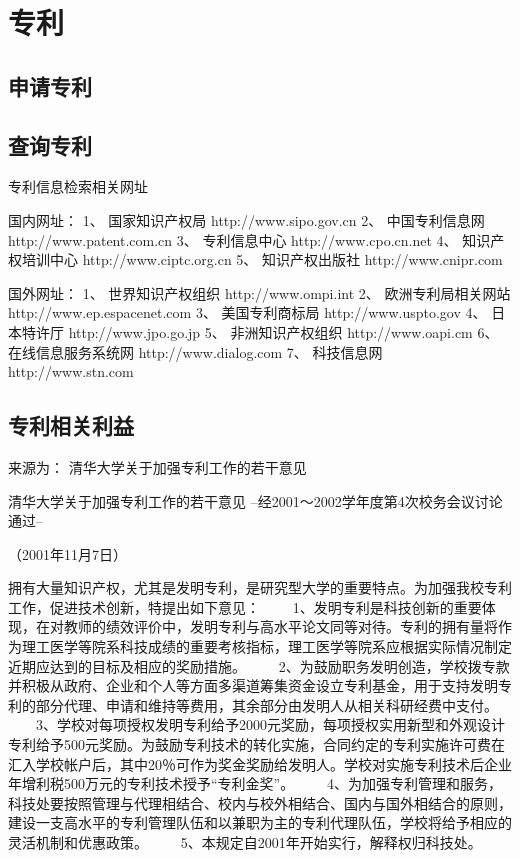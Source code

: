 \chapter{专利}


\section{申请专利}


\section{查询专利}


专利信息检索相关网址


国内网址：
1、 国家知识产权局 http://www.sipo.gov.cn
2、 中国专利信息网 http://www.patent.com.cn
3、 专利信息中心 http://www.cpo.cn.net
4、 知识产权培训中心 http://www.ciptc.org.cn
5、 知识产权出版社 http://www.cnipr.com

国外网址：
1、 世界知识产权组织 http://www.ompi.int
2、 欧洲专利局相关网站 http://www.ep.espacenet.com
3、 美国专利商标局 http://www.uspto.gov
4、 日本特许厅 http://www.jpo.go.jp
5、 非洲知识产权组织 http://www.oapi.cm
6、 在线信息服务系统网 http://www.dialog.com
7、 科技信息网 http://www.stn.com

\section{专利相关利益}
来源为： 清华大学关于加强专利工作的若干意见

清华大学关于加强专利工作的若干意见
--经2001～2002学年度第4次校务会议讨论通过--

（2001年11月7日）


拥有大量知识产权，尤其是发明专利，是研究型大学的重要特点。为加强我校专利工作，促进技术创新，特提出如下意见：
　　1、发明专利是科技创新的重要体现，在对教师的绩效评价中，发明专利与高水平论文同等对待。专利的拥有量将作为理工医学等院系科技成绩的重要考核指标，理工医学等院系应根据实际情况制定近期应达到的目标及相应的奖励措施。
　　2、为鼓励职务发明创造，学校拨专款并积极从政府、企业和个人等方面多渠道筹集资金设立专利基金，用于支持发明专利的部分代理、申请和维持等费用，其余部分由发明人从相关科研经费中支付。
　　3、学校对每项授权发明专利给予2000元奖励，每项授权实用新型和外观设计专利给予500元奖励。为鼓励专利技术的转化实施，合同约定的专利实施许可费在汇入学校帐户后，其中20％可作为奖金奖励给发明人。学校对实施专利技术后企业年增利税500万元的专利技术授予“专利金奖”。
　　4、为加强专利管理和服务，科技处要按照管理与代理相结合、校内与校外相结合、国内与国外相结合的原则，建设一支高水平的专利管理队伍和以兼职为主的专利代理队伍，学校将给予相应的灵活机制和优惠政策。
　　5、本规定自2001年开始实行，解释权归科技处。
　　
　　